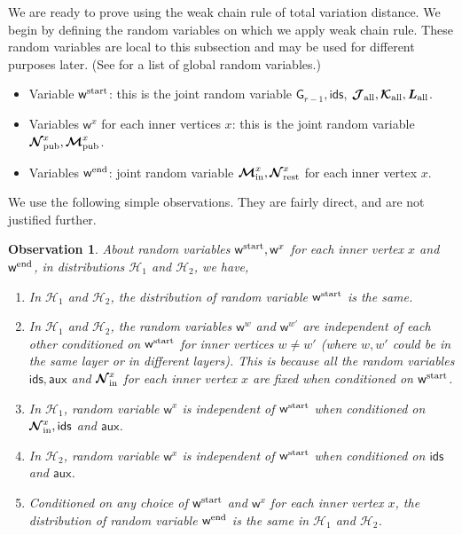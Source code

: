\documentclass[11pt]{article}
\newtheorem{observation}[lemma]{Observation}
\theoremstyle{definition}
\newcommand{\rv}[1]{\ensuremath{{\mathsf{#1}}}\xspace}
\newcommand{\rNinner}[2]{\ensuremath{\bm{\mathcal{N}}_{\textnormal{in}}^{#1_{#2}}}}
\newcommand{\cH}{\ensuremath{\mathcal{H}}}
\newcommand{\raux}{\ensuremath{\rv{aux}}}
\newcommand{\rcJall}{\ensuremath{\bm{\mathcal{J}}_{\textnormal{all}}}}
\newcommand{\rcKall}{\ensuremath{\bm{\mathcal{K}}_{\textnormal{all}}}}
\newcommand{\rLall}{\ensuremath{\bm{L}_{\textnormal{all}}}}
\newcommand{\rNpub}[1]{\ensuremath{\bm{\mathcal{N}}_{\textnormal{pub}}^{#1}}}
\newcommand{\rMpub}[1]{\ensuremath{\bm{\mathcal{M}}_{\textnormal{pub}}^{#1}}}
\newcommand{\rMinner}[1]{\ensuremath{\bm{\mathcal{M}}_{\textnormal{in}}^{#1}}}
\newcommand{\rNrest}[1]{\ensuremath{\bm{\mathcal{N}}^{#1}_{\textnormal{rest}}}}
\newcommand{\rG}{\ensuremath{\rv{G}}}
\newcommand{\rids}{\ensuremath{\rv{ids}}}
\newcommand{\rw}{\rv{w}}
\newcommand{\rwstart}{\rv{w}^{\textnormal{start}}}
\newcommand{\rwend}{\rv{w}^{\textnormal{end}}}
\begin{document}
We are ready to prove  using the weak chain rule of total variation distance. 
We begin by defining the random variables on which we apply weak chain rule. These random variables are local to this subsection and may be used for different purposes later. (See  for a list of global random variables.)
	\begin{itemize}
		\item Variable $\rwstart$: this is the joint random variable $\rG_{r-1}, \rids$, $\rcJall, \rcKall, \rLall$. 
		\item Variables $\rw^{x}$ for each inner vertices $x$: this is the joint random variable $\rNpub{x}, \rMpub{x}$.
		\item Variables $\rwend$: joint random variable $\rMinner{x}, \rNrest{x}$ for each inner vertex $x$. 
	\end{itemize}

We use the following simple observations. They are fairly direct, and are not justified further.
\begin{observation}\label{obs:inter-H1H2-list}
About random variables $\rwstart, \rw^x$ for each inner vertex $x$ and $\rwend$, in distributions $\cH_1$ and $\cH_2$, we have, 
\begin{enumerate}[label=$(\roman*)$]
\item \label{item:wstart-same-H1H2} In $\cH_1$ and $\cH_2$, the distribution of random variable $\rwstart$ is the same. 
\item \label{item:wx-indep-H1H2} In $\cH_1$ and $\cH_2$, the random variables $\rw^w$ and $\rw^{w'}$ are independent of each other conditioned on $\rwstart$ for inner vertices $w \neq w'$ (where $w, w'$ could be in the same layer or in different layers). This is because all the random variables $\rids, \raux$ and $\rNinner{x}{}$ for each inner vertex $x$ are fixed when conditioned on $\rwstart$. 
\item \label{item:wx-indep-H1} In $\cH_1$, random variable $\rw^x$ is independent of $\rwstart$ when conditioned on $\rNinner{x}{} , \rids$ and $\raux$. 
\item \label{item:wx-indep-H2} In $\cH_2$, random variable $\rw^x$ is independent of $\rwstart$ when conditioned on $\rids$ and $\raux$.
\item \label{item:wend-indep-H1H2} Conditioned on any choice of $\rwstart$ and $\rw^x$ for each inner vertex $x$, the distribution of random variable $\rwend$ is the same in $\cH_1$ and $\cH_2$. 
\end{enumerate}
\end{observation}
\end{document}
